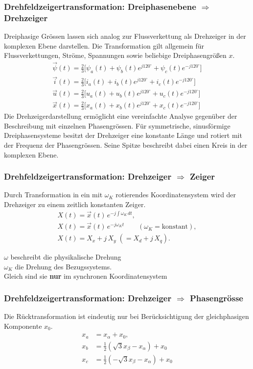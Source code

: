\subsubsection{Drehfeldzeigertransformation: Dreiphasenebene $\Rightarrow$ Drehzeiger}
Dreiphasige Grössen lassen sich analog zur Flussverkettung als Drehzeiger
in der komplexen Ebene darstellen. Die Transformation gilt allgemein für
Flussverkettungen, Ströme, Spannungen sowie beliebige Dreiphasengrößen $x$.
\begin{gather*}
\vec{\psi}(t) = \frac{2}{3}\Big[\psi_a(t) + \psi_b(t) e^{j120^\circ} + \psi_c(t) e^{-j120^\circ}\Big] \\
\vec{i}(t) = \frac{2}{3}\Big[i_a(t) + i_b(t) e^{j120^\circ} + i_c(t) e^{-j120^\circ}\Big] \\
\vec{u}(t) = \frac{2}{3}\Big[u_a(t) + u_b(t) e^{j120^\circ} + u_c(t) e^{-j120^\circ}\Big] \\
\vec{x}(t) = \frac{2}{3}\Big[x_a(t) + x_b(t) e^{j120^\circ} + x_c(t) e^{-j120^\circ}\Big]
\end{gather*}
Die Drehzeigerdarstellung ermöglicht eine vereinfachte Analyse gegenüber
der Beschreibung mit einzelnen Phasengrössen. Für symmetrische,
sinusförmige Dreiphasensysteme besitzt der Drehzeiger eine konstante Länge
und rotiert mit der Frequenz der Phasengrössen. Seine Spitze beschreibt
dabei einen Kreis in der komplexen Ebene.

\subsubsection{Drehfeldzeigertransformation: Drehzeiger $\Rightarrow$ Zeiger}
Durch Transformation in ein mit $\omega_K$ rotierendes Koordinatensystem wird der
Drehzeiger zu einem zeitlich konstanten Zeiger.
\begin{gather*}
X(t) = \vec{x}(t)\, e^{-j\int \omega_K\, dt}, \\
X(t) = \vec{x}(t)\, e^{-j\omega_K t} \qquad (\omega_K = \text{konstant}), \\
X(t) = X_x + j\,X_y \;(= X_d + j\,X_q).
\end{gather*}
\begin{achtung}
$\omega$ beschreibt die physikalische Drehung\\
$\omega_K$ die Drehung des Bezugssystems.\\
Gleich sind sie \textbf{nur} im synchronen Koordinatensystem
\end{achtung}

\columnbreak
\subsubsection{Drehfeldzeigertransformation: Drehzeiger $\Rightarrow$ Phasengrösse}
Die Rücktransformation ist eindeutig nur bei Berücksichtigung der gleichphasigen Komponente $x_0$.
\vspace{2em}
\begin{align*}
x_a &= x_\alpha + x_0, \\
x_b &= \tfrac{1}{2}(\sqrt{3}x_\beta - x_\alpha) + x_0 \\
x_c &= \tfrac{1}{2}(-\sqrt{3}x_\beta - x_\alpha) + x_0
\end{align*}
\vspace{1em}
